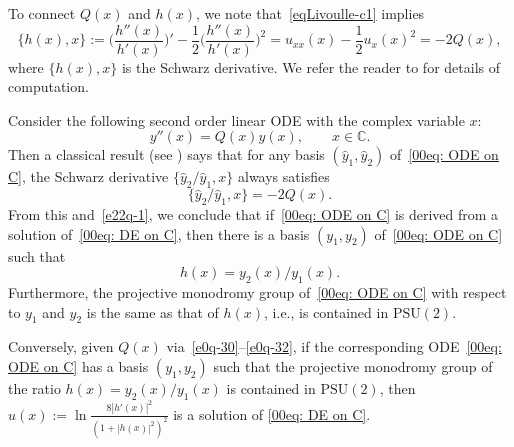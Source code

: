 \documentclass[11pt]{article}
\numberwithin{equation}{section}
\numberwithin{equation}{section}
\def\PSU{\mathrm{PSU}}
\begin{document}
To connect $Q(x)$ and $h(x)$, we note that~\eqref{eqLivoulle-c1} implies
\begin{equation}\label{e22q-1}
\{h(x),x\}:=\biggl(\frac{h''(x)}{h'(x)}\biggr)'-\frac12 \biggl(\frac{h''(x)}{h'(x)}\biggr)^2=u_{xx}(x)-\frac12 u_x(x)^2=-2Q(x),
\end{equation}
where $\{h(x),x\}$ is the Schwarz derivative. We refer the reader to
\cite{Chai-Lin-Wang} for details of computation.

Consider the following second order linear ODE with the complex variable $x$:
\begin{equation}\label{00eq: ODE on C}
y''(x)=Q(x)y(x),\qquad x\in\mathbb{C}.
\end{equation}
Then a classical result (see \cite{Whittaker-Watson}) says that for
any basis $(\hat{y}_1,\hat{y}_2)$ of~\eqref{00eq: ODE on C}, the
Schwarz derivative $\{\hat{y}_2/\hat{y}_1,x\}$ always satisfies
\begin{equation*}
\{\hat{y}_2/\hat{y}_1,x\}=-2Q(x).
\end{equation*}
From this and~\eqref{e22q-1}, we conclude that if~\eqref{00eq: ODE on
 C} is derived from a solution of~\eqref{00eq: DE on C}, then there
is a basis $(y_1,y_2)$ of~\eqref{00eq: ODE on C} such that
\begin{equation}\label{e22q-2}
h(x)=y_2(x)/y_1(x).
\end{equation}
Furthermore, the projective monodromy group of~\eqref{00eq: ODE on C}
with respect to $y_1$ and $y_2$ is the same as that of $h(x)$, i.e., is
contained in $\PSU(2)$.

Conversely, given $Q(x)$ via~\eqref{e0q-30}--\eqref{e0q-32}, if the
corresponding ODE~\eqref{00eq: ODE on C} has a basis $(y_1,y_2)$ such
that the projective monodromy group of the ratio $h(x)=y_2(x)/y_1(x)$
is contained in $\PSU(2)$, then
$u(x):=\ln\frac{8|h'(x)|^2}{(1+|h(x)|^2)^2}$ is a solution of
\eqref{00eq: DE on C}.
\end{document}
